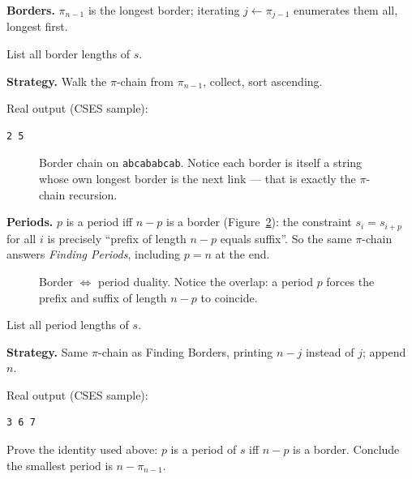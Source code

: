 \textbf{Borders.} $\pi_{n-1}$ is the longest border; iterating
$j \leftarrow \pi_{j-1}$ enumerates them all, longest first.
\begin{example}\label{ex:borders}
List all border lengths of $s$.
\par\smallskip
\textbf{Strategy.} Walk the $\pi$-chain from $\pi_{n-1}$, collect,
sort ascending.
\par\smallskip
\begin{solution}

Real output (CSES sample):
\begin{lstlisting}[numbers=none]
2 5
\end{lstlisting}
\end{solution}
\end{example}
\begin{figure}[ht]\centering

\caption{Border chain on \texttt{abcababcab}. Notice each border
is itself a string whose own longest border is the next link ---
that is exactly the $\pi$-chain recursion.}
\label{fig:borders}
\end{figure}

\textbf{Periods.} $p$ is a period iff $n-p$ is a border
(Figure~\ref{fig:period}): the constraint $s_i = s_{i+p}$ for all
$i$ is precisely ``prefix of length $n-p$ equals suffix''. So the
same $\pi$-chain answers \emph{Finding Periods}, including
$p = n$ at the end.
\begin{figure}[ht]\centering

\caption{Border $\Leftrightarrow$ period duality. Notice the
overlap: a period $p$ forces the prefix and suffix of length
$n-p$ to coincide.}
\label{fig:period}
\end{figure}
\begin{example}\label{ex:periods}
List all period lengths of $s$.
\par\smallskip
\textbf{Strategy.} Same $\pi$-chain as Finding Borders, printing
$n-j$ instead of $j$; append $n$.
\par\smallskip
\begin{solution}

Real output (CSES sample):
\begin{lstlisting}[numbers=none]
3 6 7
\end{lstlisting}
\end{solution}
\end{example}
\begin{exercise}[medium]\label{exr:periodid}
Prove the identity used above: $p$ is a period of $s$ iff $n-p$
is a border. Conclude the smallest period is $n - \pi_{n-1}$.
\end{exercise}

